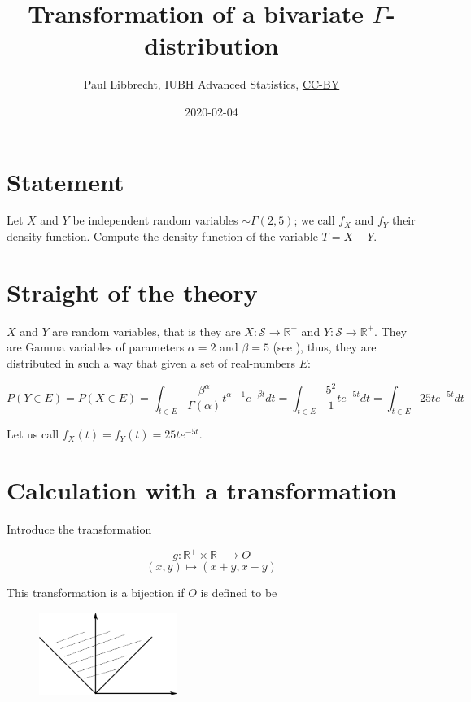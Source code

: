 \documentclass{article}
\newcommand\R{{\mathbb R}}
\begin{document}
\title{Transformation of a bivariate $\Gamma$-distribution}
\date{2020-02-04}

\author{Paul Libbrecht, IUBH Advanced Statistics, \href{https://creativecommons.org/licenses/by/4.0/}{CC-BY}}
\maketitle




\section{Statement}

Let $X$ and $Y$ be independent random variables $\sim\Gamma(2,5)$; we call $f_X$ and $f_Y$ their density function.
Compute the density function of the variable $T=X+Y$.

\section{Straight of the theory}

$X$ and $Y$ are random variables, that is they are $X:{\mathcal S}\longrightarrow \R^+$ and $Y:{\mathcal S}\longrightarrow \R^+$.
They are Gamma variables of parameters $\alpha=2$ and $\beta=5$ (see \cite{Wikipedia-Gamma}), thus, they are distributed in such a way that given a set of real-numbers $E$:

$$P(Y\in E) = P(X\in E) 
  = \int_{t\in E} \frac{\beta^\alpha}{\Gamma({\alpha})}t^{\alpha-1}e^{-\beta t}dt 
  = \int_{t\in E} \frac{5^2}{1} t e^{-5t}dt 
  = \int_{t\in E}25te^{-5t}dt$$
  
Let us call $f_X(t)=f_Y(t) = 25te^{-5t}$.

\section{Calculation with a transformation}

Introduce the transformation 

$$g: \R^+ \times \R^+ \longrightarrow O$$
$$	(x,y) \mapsto (x+y, x-y)$$ 

This transformation is  a bijection if $O$ is defined to be\begin{figure}\includegraphics[width=45mm]{transformation-domain}\vspace{-4mm}\end{figure}
\end{document}
